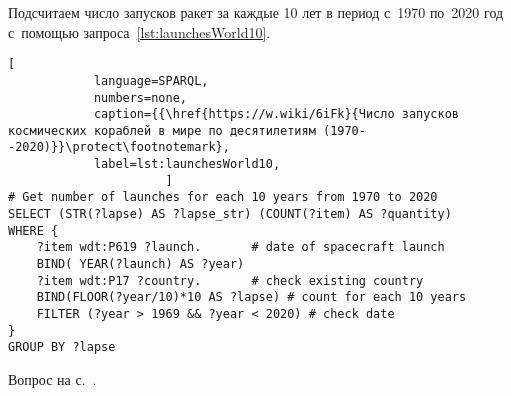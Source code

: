 \newpage
\begin{task}
    Подсчитаем число запусков ракет за каждые 10 лет в период с~1970 по~2020 год с~помощью запроса~\ref{lst:launchesWorld10}.
    \begin{lstlisting}[ 
            language=SPARQL, 
            numbers=none, 
            caption={{\href{https://w.wiki/6iFk}{Число запусков космических кораблей в мире по десятилетиям (1970--2020)}}\protect\footnotemark}, 
            label=lst:launchesWorld10, 
                      ]
# Get number of launches for each 10 years from 1970 to 2020
SELECT (STR(?lapse) AS ?lapse_str) (COUNT(?item) AS ?quantity) 
WHERE {                  
    ?item wdt:P619 ?launch.       # date of spacecraft launch
    BIND( YEAR(?launch) AS ?year) 
    ?item wdt:P17 ?country.       # check existing country
    BIND(FLOOR(?year/10)*10 AS ?lapse) # count for each 10 years
    FILTER (?year > 1969 && ?year < 2020) # check date
} 
GROUP BY ?lapse
\end{lstlisting}

    \small{\AnswerBackref Вопрос на с.~\pageref{question:spacecraft_2}.}
\label{answer:max-min-space-launches}
\end{task}


